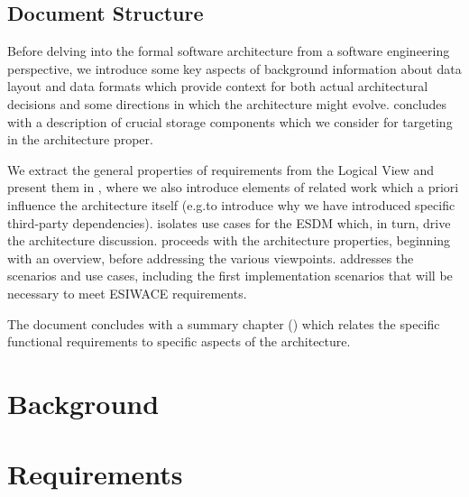 \documentclass[a4paper,11pt]{esiwace-modified}
\begin{document}
\section{Document Structure}

Before delving into the formal software architecture from a software engineering perspective,
we introduce some key aspects of background information about data layout and data formats which provide context for both actual architectural decisions and some directions in which the architecture might evolve.
 concludes with a description of crucial storage components which we consider for targeting in the architecture proper.

We extract the general properties of requirements from the Logical View and present them in , where we also introduce elements
of related work which a priori influence the architecture itself (e.g.to introduce why we have introduced specific third-party dependencies).
 isolates use cases for the ESDM which, in turn, drive the architecture discussion.
 proceeds with the architecture properties, beginning with an overview, before addressing the various viewpoints.
 addresses the scenarios and use cases, including the first implementation scenarios that will be necessary to meet ESIWACE requirements.

The document concludes with a summary chapter () which relates the specific functional requirements to specific aspects of the architecture.



 \chapter{Background}
\label{sec:background}







\chapter{Requirements}
\label{sec:requirements}


%
\end{document}
